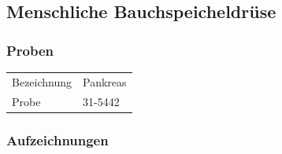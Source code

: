\newpage
\subsection{Menschliche Bauchspeicheldrüse}

\subsubsection{Proben}
\begin{table}[h!]
	\centering
	\begin{tabular}{l l}
		Bezeichnung	& Pankreas \\
		Probe 		& 31-5442
	\end{tabular}
\end{table}

\subsubsection{Aufzeichnungen}
